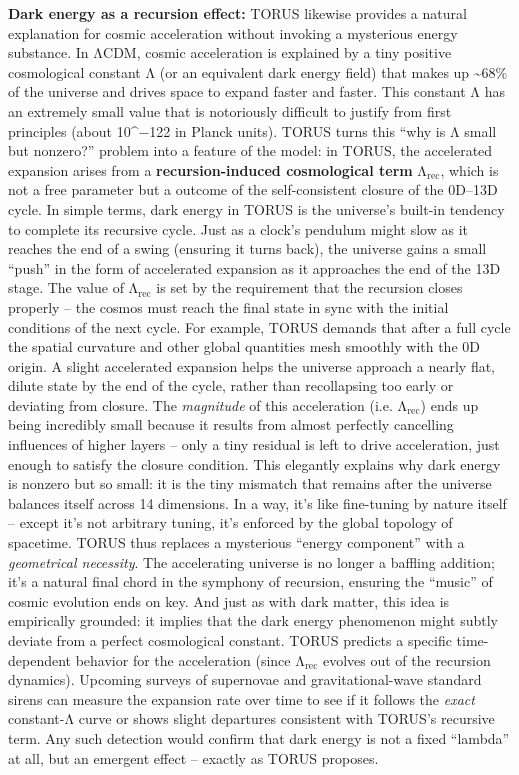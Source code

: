 \documentclass[]{article}
\newcommand{\subscript}[1]{\ensuremath{_{\mathrm{#1}}}}
\begin{document}
\textbf{Dark energy as a recursion effect:} TORUS likewise provides a
natural explanation for cosmic acceleration without invoking a
mysterious energy substance. In ΛCDM, cosmic acceleration is explained
by a tiny positive cosmological constant Λ (or an equivalent dark energy
field) that makes up \textasciitilde{}68\% of the universe and drives
space to expand faster and faster. This constant Λ has an extremely
small value that is notoriously difficult to justify from first
principles (about 10\^{}−122 in Planck units)​. TORUS turns this ``why
is Λ small but nonzero?'' problem into a feature of the model: in TORUS,
the accelerated expansion arises from a \textbf{recursion-induced
cosmological term}
Λ\subscript{rec}, which
is not a free parameter but a outcome of the self-consistent closure of
the 0D--13D cycle​. In simple terms, dark energy in TORUS is the
universe's built-in tendency to complete its recursive cycle. Just as a
clock's pendulum might slow as it reaches the end of a swing (ensuring
it turns back), the universe gains a small ``push'' in the form of
accelerated expansion as it approaches the end of the 13D stage. The
value of Λ\subscript{rec}
is set by the requirement that the recursion closes properly -- the
cosmos must reach the final state in sync with the initial conditions of
the next cycle​. For example, TORUS demands that after a full cycle the
spatial curvature and other global quantities mesh smoothly with the 0D
origin. A slight accelerated expansion helps the universe approach a
nearly flat, dilute state by the end of the cycle, rather than
recollapsing too early or deviating from closure​. The \emph{magnitude}
of this acceleration (i.e.
Λ\subscript{rec}) ends up
being incredibly small because it results from almost perfectly
cancelling influences of higher layers -- only a tiny residual is left
to drive acceleration, just enough to satisfy the closure condition​.
This elegantly explains why dark energy is nonzero but so small: it is
the tiny mismatch that remains after the universe balances itself across
14 dimensions. In a way, it's like fine-tuning by nature itself --
except it's not arbitrary tuning, it's enforced by the global topology
of spacetime. TORUS thus replaces a mysterious ``energy component'' with
a \emph{geometrical necessity}. The accelerating universe is no longer a
baffling addition; it's a natural final chord in the symphony of
recursion, ensuring the ``music'' of cosmic evolution ends on key. And
just as with dark matter, this idea is empirically grounded: it implies
that the dark energy phenomenon might subtly deviate from a perfect
cosmological constant. TORUS predicts a specific time-dependent behavior
for the acceleration (since
Λ\subscript{rec} evolves
out of the recursion dynamics)​. Upcoming surveys of supernovae and
gravitational-wave standard sirens can measure the expansion rate over
time to see if it follows the \emph{exact} constant-Λ curve or shows
slight departures consistent with TORUS's recursive term​. Any such
detection would confirm that dark energy is not a fixed ``lambda'' at
all, but an emergent effect -- exactly as TORUS proposes.
\end{document}
